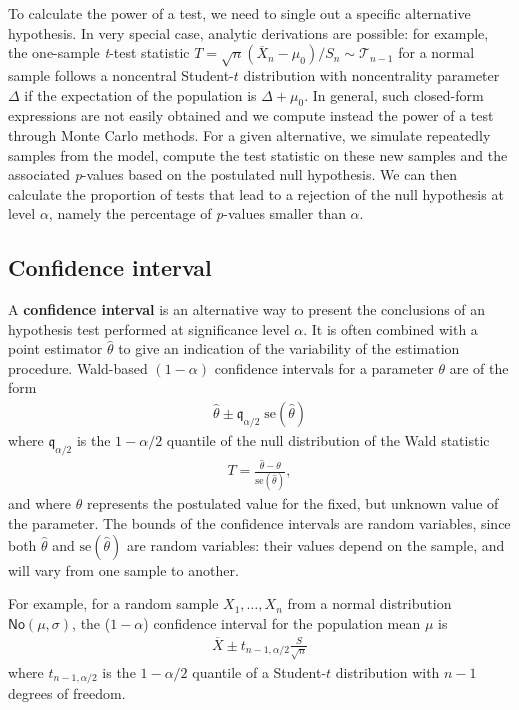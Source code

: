 \documentclass[
  11pt,
  letterpaper,
]{book}
\theoremstyle{definition}
\theoremstyle{definition}
\theoremstyle{definition}
\theoremstyle{remark}
\begin{document}
To calculate the power of a test, we need to single out a specific alternative hypothesis. In very special case, analytic derivations are possible: for example, the one-sample \emph{t}-test statistic \(T=\sqrt{n}(\overline{X}_n-\mu_0)/S_n \sim \mathcal{T}_{n-1}\) for a normal sample follows a noncentral Student-\(t\) distribution with noncentrality parameter \(\Delta\) if the expectation of the population is \(\Delta + \mu_0\). In general, such closed-form expressions are not easily obtained and we compute instead the power of a test through Monte Carlo methods. For a given alternative, we simulate repeatedly samples from the model, compute the test statistic on these new samples and the associated \emph{p}-values based on the postulated null hypothesis. We can then calculate the proportion of tests that lead to a rejection of the null hypothesis at level \(\alpha\), namely the percentage of \emph{p}-values smaller than \(\alpha\).

\hypertarget{confidence-interval}{%
\subsection{Confidence interval}\label{confidence-interval}}

A \textbf{confidence interval} is an alternative way to present the conclusions of an hypothesis test performed at significance level \(\alpha\). It is often combined with a point estimator \(\hat{\theta}\) to give an indication of the variability of the estimation procedure. Wald-based \((1-\alpha)\) confidence intervals for a parameter \(\theta\) are of the form
\begin{align*}
\widehat{\theta} \pm \mathfrak{q}_{\alpha/2} \; \mathrm{se}(\widehat{\theta})
\end{align*}
where \(\mathfrak{q}_{\alpha/2}\) is the \(1-\alpha/2\) quantile of the null distribution of the Wald statistic
\begin{align*}
T =\frac{\widehat{\theta}-\theta}{\mathrm{se}(\widehat{\theta})},
\end{align*}
and where \(\theta\) represents the postulated value for the fixed, but unknown value of the parameter. The bounds of the confidence intervals are random variables, since both \(\widehat{\theta}\) and \(\mathrm{se}(\widehat{\theta})\) are random variables: their values depend on the sample, and will vary from one sample to another.

For example, for a random sample \(X_1, \ldots, X_n\) from a normal distribution \(\mathsf{No}(\mu, \sigma)\), the (\(1-\alpha\)) confidence interval for the population mean \(\mu\) is
\begin{align*}
\overline{X} \pm t_{n-1, \alpha/2} \frac{S}{\sqrt{n}}
\end{align*}
where \(t_{n-1,\alpha/2}\) is the \(1-\alpha/2\) quantile of a Student-\(t\) distribution with \(n-1\) degrees of freedom.
\end{document}
